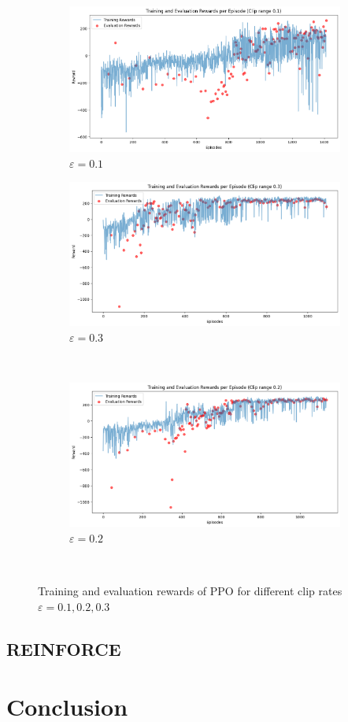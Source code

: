 \documentclass[a4paper, 11pt]{article}
\begin{document}
	\begin{figure}[H]
		\begin{center}
			\begin{subfigure}{0.48\textwidth}
				\includegraphics[width=\linewidth]{ppo_figures/cr_results_0.1.png}
				\caption{$\varepsilon=0.1$}
				\label{fig:ppo_cr01}
			\end{subfigure}\hfill 
			\begin{subfigure}{0.48\textwidth}
				\includegraphics[width=\linewidth]{ppo_figures/cr_results_0.3.png}
				\caption{$\varepsilon=0.3$}
				\label{fig:ppo_cr03}
			\end{subfigure}\\ 
			\begin{subfigure}{0.48\textwidth}
				\includegraphics[width=\linewidth]{ppo_figures/cr_results_0.2.png}
				\caption{$\varepsilon=0.2$}
				\label{fig:ppo_cr02}
			\end{subfigure}\
		\end{center}
		\caption{Training and evaluation rewards of PPO for different clip rates $\varepsilon=0.1,0.2,0.3$}
		\label{fig:ppo_cliprate}
	\end{figure}
	
	\subsection{REINFORCE}
	\section{Conclusion}
	
\end{document}
